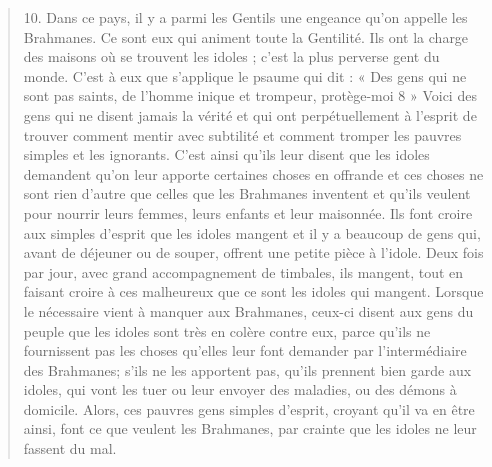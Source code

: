 \begin{quote}
10. Dans ce pays, il y a parmi les Gentils une engeance qu'on
appelle les Brahmanes. Ce sont eux qui animent toute la Gentilité.
Ils ont la charge des maisons où se trouvent les idoles ; c'est la plus
perverse gent du monde. C'est à eux que s'applique le psaume qui
dit : « Des gens qui ne sont pas saints, de l'homme inique et trompeur,
protège-moi 8 » Voici des gens qui ne disent jamais la vérité
et qui ont perpétuellement à l'esprit de trouver comment mentir
avec subtilité et comment tromper les pauvres simples et les ignorants.
C'est ainsi qu'ils leur disent que les idoles demandent qu'on
leur apporte certaines choses en offrande et ces choses ne sont rien
d'autre que celles que les Brahmanes inventent et qu'ils veulent
pour nourrir leurs femmes, leurs enfants et leur maisonnée. Ils font
croire aux simples d'esprit que les idoles mangent et il y a beaucoup
de gens qui, avant de déjeuner ou de souper, offrent une
petite pièce à l'idole. Deux fois par jour, avec grand accompagnement
de timbales, ils mangent, tout en faisant croire à ces malheureux
que ce sont les idoles qui mangent. Lorsque le nécessaire vient
à manquer aux Brahmanes, ceux-ci disent aux gens du peuple que
les idoles sont très en colère contre eux, parce qu'ils ne fournissent
pas les choses qu'elles leur font demander par l'intermédiaire
  des Brahmanes; s'ils ne les apportent pas, qu'ils prennent bien
garde aux idoles, qui vont les tuer ou leur envoyer des maladies,
ou des démons à domicile. Alors, ces pauvres gens simples d'esprit,
croyant qu'il va en être ainsi, font ce que veulent les Brahmanes,
par crainte que les idoles ne leur fassent du mal.



\end{quote}
